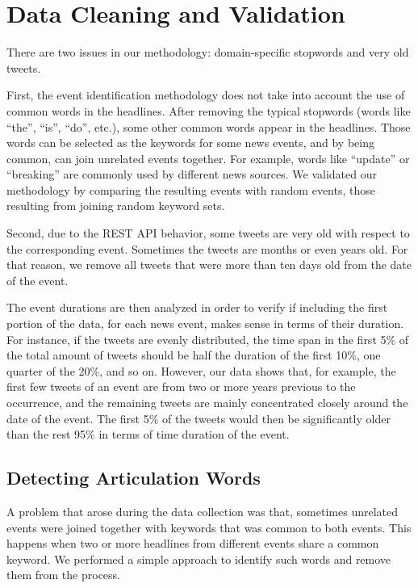 \section{Data Cleaning and Validation}\label{sec:cleaning}

There are two issues in our methodology: domain-specific stopwords and very old
tweets.

First, the event identification methodology does not take into account the use
of common words in the headlines. 
%
After removing the typical stopwords (words like ``the'', ``is'', ``do'', etc.),
some other common words appear in the headlines. 
%
Those words can be selected as the keywords for some news events, and by being
common, can join unrelated events together.
%
For example, words like ``update'' or ``breaking'' are commonly used by
different news sources. 
%
We validated our methodology by comparing the resulting events with random
events, those resulting from joining random keyword sets.

Second, due to the REST API behavior, some tweets are very old with respect to
the corresponding event. 
%
Sometimes the tweets are months or even years old. 
%
For that reason, we remove all tweets that were more than ten days old from the
date of the event. 

The event durations are then analyzed in order to verify if including the first
portion of the data, for each news event, makes sense in terms of their
duration. 
%
For instance, if the tweets are evenly distributed, the time span in the first
5\% of the total amount of tweets should be half the duration of the first 10\%,
one quarter of the 20\%, and so on. 
%
However, our data shows that, for example, the first few tweets of an event are
from two or more years previous to the occurrence, and the remaining tweets are
mainly concentrated closely around the date of the event.
%
The first 5\% of the tweets would then be significantly older than the rest
95\% in terms of time duration of the event. 


\subsection{Detecting Articulation Words}

A problem that arose during the data collection was that, sometimes unrelated
events were joined together with keywords that was common to both events.  
%
This happens when two or more headlines from different events share a common
keyword. 
%
We performed a simple approach to identify such words and remove them from the
process.

